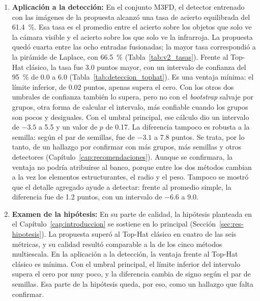 \begin{enumerate}
\item \textbf{Aplicación a la detección:} En el conjunto M3FD, el detector entrenado con las imágenes
de la propuesta alcanzó una tasa de acierto equilibrada del 61.4~\%. Esa tasa es el promedio entre el
acierto sobre los objetos que solo ve la cámara visible y el acierto sobre los que solo ve la infrarroja. La propuesta quedó
cuarta entre las ocho entradas fusionadas; la mayor tasa correspondió a la pirámide de Laplace, con
66.5~\% (Tabla~\ref{tab:v2_tasas}). Frente al Top-Hat clásico, la tasa fue 3.0 puntos mayor, con un
intervalo de confianza del 95~\% de 0.0 a 6.0 (Tabla~\ref{tab:deteccion_tophat}). Es una ventaja
mínima: el límite inferior, de 0.02 puntos, apenas supera el cero. Con los
otros dos umbrales de confianza también lo supera, pero no con el \textit{bootstrap} salvaje por grupos, otra forma de
calcular el intervalo, más confiable cuando los grupos son pocos y desiguales. Con el umbral principal, ese
cálculo dio un intervalo de $-3.5$ a 5.5 y un valor de $p$ de 0.17. La diferencia tampoco es robusta a la
semilla: según el par de semillas, fue de $-3.1$ a 7.8 puntos. Se trata, por lo tanto, de un hallazgo por confirmar con más grupos, más semillas y otros
detectores (Capítulo~\ref{cap:recomendaciones}). Aunque se confirmara, la ventaja no podría atribuirse
al banco, porque entre los dos métodos cambian a la vez los elementos estructurantes, el radio y el
peso. Tampoco se mostró que el detalle agregado ayude a detectar: frente al promedio simple, la
diferencia fue de 1.2 puntos, con un intervalo de $-6.6$ a 9.0.

\item \textbf{Examen de la hipótesis:} En su parte de calidad, la hipótesis planteada en el
Capítulo~\ref{cap:introduccion} se sostiene en lo principal (Sección~\ref{sec:res-hipotesis}). La propuesta superó
al Top-Hat clásico en cuatro de las seis métricas, y su calidad resultó comparable a la de los cinco
métodos multiescala. En la aplicación a la detección, la ventaja frente al Top-Hat clásico es mínima.
Con el umbral principal, el límite inferior del intervalo supera el cero por muy poco, y la diferencia
cambia de signo según el par de semillas. Esa parte de la hipótesis queda, por eso, como un hallazgo
que falta confirmar.
\end{enumerate}

